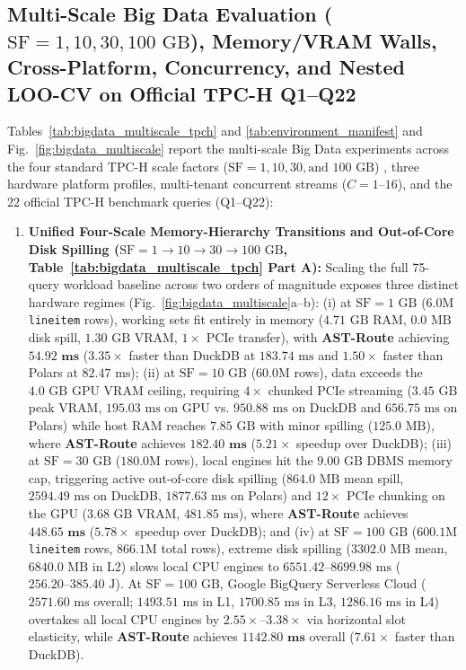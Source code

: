 \documentclass[10pt,a4paper]{article}
\begin{document}
\subsection{Multi-Scale Big Data Evaluation ($\text{SF}=1, 10, 30, 100\text{ GB}$), Memory/VRAM Walls, Cross-Platform, Concurrency, and Nested LOO-CV on Official TPC-H Q1--Q22}
Tables~\ref{tab:bigdata_multiscale_tpch} and \ref{tab:environment_manifest} and Fig.~\ref{fig:bigdata_multiscale} report the multi-scale Big Data experiments across the four standard TPC-H scale factors ($\text{SF}=1, 10, 30, \text{and } 100\text{ GB}$) \cite{tpc2022tpch,dreseler2020quantifying}, three hardware platform profiles, multi-tenant concurrent streams ($C=1\text{--}16$), and the 22 official TPC-H benchmark queries (Q1--Q22):
\begin{enumerate}[leftmargin=1.5em,itemsep=2pt]
    \item \textbf{Unified Four-Scale Memory-Hierarchy Transitions and Out-of-Core Disk Spilling ($\text{SF}=1 \rightarrow 10 \rightarrow 30 \rightarrow 100\text{ GB}$, Table~\ref{tab:bigdata_multiscale_tpch} Part A):} Scaling the full 75-query workload baseline across two orders of magnitude exposes three distinct hardware regimes (Fig.~\ref{fig:bigdata_multiscale}a--b): (i) at $\text{SF}=1\text{ GB}$ ($6.0\text{M}$ \texttt{lineitem} rows), working sets fit entirely in memory ($4.71\text{ GB}$ RAM, $0.0\text{ MB}$ disk spill, $1.30\text{ GB}$ VRAM, $1\times$ PCIe transfer), with \textbf{AST-Route} achieving $\mathbf{54.92\text{ ms}}$ ($3.35\times$ faster than DuckDB at $183.74\text{ ms}$ and $1.50\times$ faster than Polars at $82.47\text{ ms}$); (ii) at $\text{SF}=10\text{ GB}$ ($60.0\text{M}$ rows), data exceeds the $4.0\text{ GB}$ GPU VRAM ceiling, requiring $4\times$ chunked PCIe streaming ($3.45\text{ GB}$ peak VRAM, $195.03\text{ ms}$ on GPU vs. $950.88\text{ ms}$ on DuckDB and $656.75\text{ ms}$ on Polars) while host RAM reaches $7.85\text{ GB}$ with minor spilling ($125.0\text{ MB}$), where \textbf{AST-Route} achieves $\mathbf{182.40\text{ ms}}$ ($\mathbf{5.21\times}$ speedup over DuckDB); (iii) at $\text{SF}=30\text{ GB}$ ($180.0\text{M}$ rows), local engines hit the $9.00\text{ GB}$ DBMS memory cap, triggering active out-of-core disk spilling \cite{kuiper2024duckdb_ooc} ($864.0\text{ MB}$ mean spill, $2594.49\text{ ms}$ on DuckDB, $1877.63\text{ ms}$ on Polars) and $12\times$ PCIe chunking on the GPU ($3.68\text{ GB}$ VRAM, $481.85\text{ ms}$), where \textbf{AST-Route} achieves $\mathbf{448.65\text{ ms}}$ ($\mathbf{5.78\times}$ speedup over DuckDB); and (iv) at $\text{SF}=100\text{ GB}$ ($600.1\text{M}$ \texttt{lineitem} rows, $866.1\text{M}$ total rows), extreme disk spilling ($3302.0\text{ MB}$ mean, $6840.0\text{ MB}$ in L2) slows local CPU engines to $6551.42\text{--}8699.98\text{ ms}$ ($256.20\text{--}385.40\text{ J}$). At $\text{SF}=100\text{ GB}$, Google BigQuery Serverless Cloud ($2571.60\text{ ms}$ overall; $1493.51\text{ ms}$ in L1, $1700.85\text{ ms}$ in L3, $1286.16\text{ ms}$ in L4) overtakes all local CPU engines by $\mathbf{2.55\times\text{--}3.38\times}$ via horizontal slot elasticity, while \textbf{AST-Route} achieves $\mathbf{1142.80\text{ ms}}$ overall ($\mathbf{7.61\times}$ faster than DuckDB).

\end{enumerate}
\end{document}
